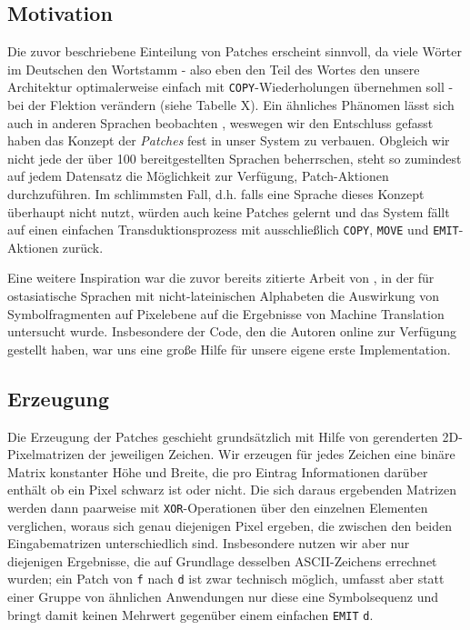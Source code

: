 \documentclass[11pt,a4paper]{article}
\newcommand{\action}[1]{\texttt{#1}}
\begin{document}
\subsection{Motivation}
Die zuvor beschriebene Einteilung von Patches erscheint sinnvoll, da viele Wörter im Deutschen den Wortstamm - also eben den Teil des Wortes den unsere Architektur optimalerweise einfach mit \action{COPY}-Wiederholungen übernehmen soll - bei der Flektion verändern (siehe Tabelle X).
Ein ähnliches Phänomen lässt sich auch in anderen Sprachen beobachten \citep{wiese:umlaut2009, kendris:cedilla2001}, weswegen wir den Entschluss gefasst haben das Konzept der \textit{Patches} fest in unser System zu verbauen. Obgleich wir nicht jede der über 100 bereitgestellten Sprachen beherrschen, steht so zumindest auf jedem Datensatz die Möglichkeit zur Verfügung, Patch-Aktionen durchzuführen. Im schlimmsten Fall, d.h. falls eine Sprache dieses Konzept überhaupt nicht nutzt, würden auch keine Patches gelernt und das System fällt auf einen einfachen Transduktionsprozess mit ausschließlich \action{COPY}, \action{MOVE} und \action{EMIT}-Aktionen zurück.

Eine weitere Inspiration war die zuvor bereits zitierte Arbeit von \citet{cjk-mt:LiuLLN17}, in der für ostasiatische Sprachen mit nicht-lateinischen Alphabeten die Auswirkung von Symbolfragmenten auf Pixelebene auf die Ergebnisse von Machine Translation untersucht wurde.
Insbesondere der Code, den die Autoren online zur Verfügung gestellt haben, war uns eine große Hilfe für unsere eigene erste Implementation.

\subsection{Erzeugung}
Die Erzeugung der Patches geschieht grundsätzlich mit Hilfe von gerenderten 2D-Pixelmatrizen der jeweiligen Zeichen. Wir erzeugen für jedes Zeichen eine binäre Matrix konstanter Höhe und Breite, die pro Eintrag Informationen darüber enthält ob ein Pixel schwarz ist oder nicht.
Die sich daraus ergebenden Matrizen werden dann paarweise mit \texttt{XOR}-Operationen über den einzelnen Elementen verglichen, woraus sich genau diejenigen Pixel ergeben, die zwischen den beiden Eingabematrizen unterschiedlich sind. Insbesondere nutzen wir aber nur diejenigen Ergebnisse, die auf Grundlage desselben ASCII-Zeichens errechnet wurden; ein Patch von \texttt{f} nach \texttt{d} ist zwar technisch möglich, umfasst aber statt einer Gruppe von ähnlichen Anwendungen nur diese eine Symbolsequenz und bringt damit keinen Mehrwert gegenüber einem einfachen \action{EMIT} \texttt{d}.
\end{document}
